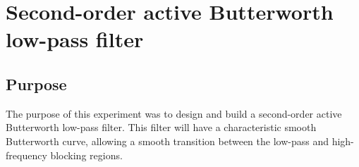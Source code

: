 \documentclass{report}
\begin{document}
\section{Second-order active Butterworth low-pass filter}

\subsection{Purpose}
The purpose of this experiment was to design and build a second-order active Butterworth low-pass filter. This filter will have a characteristic smooth Butterworth curve, allowing a smooth transition between the low-pass and high-frequency blocking regions.
\end{document}
